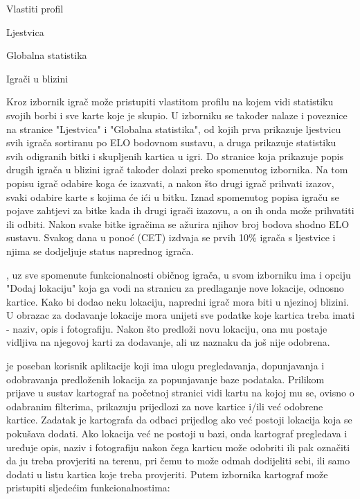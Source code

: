 		\begin{packed_item}
		    \item Vlastiti profil
		    \item Ljestvica
		    \item Globalna statistika
		    \item Igrači u blizini
		\end{packed_item}
		
		Kroz izbornik igrač može pristupiti vlastitom profilu na kojem vidi statistiku svojih borbi i sve karte koje je skupio. U izborniku se također nalaze i poveznice na stranice "Ljestvica" i "Globalna statistika", od kojih prva prikazuje ljestvicu svih igrača sortiranu po ELO bodovnom sustavu, a druga prikazuje statistiku svih odigranih bitki i skupljenih kartica u igri. Do stranice koja prikazuje popis drugih igrača u blizini igrač također dolazi preko spomenutog izbornika. Na tom popisu igrač odabire koga će izazvati, a nakon što drugi igrač prihvati izazov, svaki odabire karte s kojima će ići u bitku. Iznad spomenutog popisa igraču se pojave zahtjevi za bitke kada ih drugi igrači izazovu, a on ih onda može prihvatiti ili odbiti. Nakon svake bitke igračima se ažurira njihov broj bodova shodno ELO sustavu. Svakog dana u ponoć (CET) izdvaja se prvih 10\% igrača s ljestvice i njima se dodjeljuje status naprednog igrača.
		
		, uz sve spomenute funkcionalnosti običnog igrača, u svom izborniku ima i opciju "Dodaj lokaciju" koja ga vodi na stranicu za predlaganje nove lokacije, odnosno kartice. Kako bi dodao neku lokaciju, napredni igrač mora biti u njezinoj blizini. U obrazac za dodavanje lokacije mora unijeti sve podatke koje kartica treba imati - naziv, opis i fotografiju. Nakon što predloži novu lokaciju, ona mu postaje vidljiva na njegovoj karti za dodavanje, ali uz naznaku da još nije odobrena.
		
		 je poseban korisnik aplikacije koji ima ulogu pregledavanja, dopunjavanja i odobravanja predloženih lokacija za popunjavanje baze podataka. Prilikom prijave u sustav kartograf na početnoj stranici vidi kartu na kojoj mu se, ovisno o odabranim filterima, prikazuju prijedlozi za nove kartice i/ili već odobrene kartice. Zadatak je kartografa da odbaci prijedlog ako već postoji lokacija koja se pokušava dodati. Ako lokacija već ne postoji u bazi, onda kartograf pregledava i uređuje opis, naziv i fotografiju nakon čega karticu može odobriti ili pak označiti da ju treba provjeriti na terenu, pri čemu to može odmah dodijeliti sebi, ili samo dodati u listu kartica koje treba provjeriti. Putem izbornika kartograf može pristupiti sljedećim funkcionalnostima:
		
